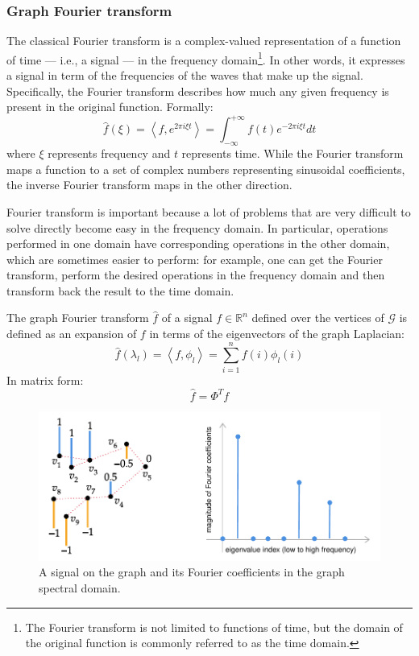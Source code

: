             \subsubsection{Graph Fourier transform}
                The classical Fourier transform is a complex-valued representation of a function of time --- i.e., a signal --- in the frequency domain\footnote{The Fourier transform is not limited to functions of time, but the domain of the original function is commonly referred to as the time domain.}. In other words, it expresses a signal in term of the frequencies of the waves that make up the signal. Specifically, the Fourier transform describes how much any given frequency is present in the original function. Formally:
                \[\hat{f}\left(\xi\right) = \left\langle f, e^{2 \pi i \xi t}\right\rangle =  \int_{-\infty}^{+\infty}f\left(t\right)e^{-2 \pi i \xi t}dt\]
                where \(\xi\) represents frequency and \(t\) represents time. While the Fourier transform maps a function to a set of complex numbers representing sinusoidal coefficients, the inverse Fourier transform maps in the other direction.
                
                Fourier transform is important because a lot of problems that are very difficult to solve directly become easy in the frequency domain. In particular, operations performed in one domain have corresponding operations in the other domain, which are sometimes easier to perform: for example, one can get the Fourier transform, perform the desired operations in the frequency domain and then transform back the result to the time domain.
                
                The graph Fourier transform \(\hat{f}\) of a signal \(f \in \mathbb{R}^n\) defined over the vertices of \(\mathcal{G}\) is defined as an expansion of \(f\) in terms of the eigenvectors of the graph Laplacian:
                \[\hat{f}\left(\lambda_l\right) = \left\langle f, \phi_l \right\rangle = \sum_{i=1}^{n}f\left(i\right)\phi_l\left(i\right)\]
                In matrix form:
                \[\hat{f} = \Phi^T f\]
                
                \begin{figure}
                    \centering
                    \includegraphics[width=\textwidth]{images/spectral_domain.pdf}
                    \caption{A signal on the graph and its Fourier coefficients in the graph spectral domain.}
                    \label{spectral_domain}
                \end{figure}
                
